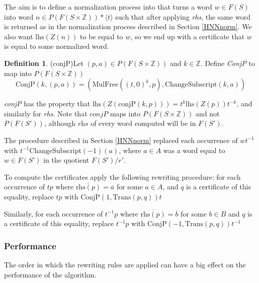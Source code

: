 \documentclass[12pt]{article} %
\theoremstyle{definition}
\theoremstyle{definition}
\theoremstyle{definition}
\theoremstyle{definition}
\theoremstyle{definition}
\newtheorem{defn}[theorem]{Definition}
\theoremstyle{definition}
\begin{document}
The aim is to define a normalization process into that turns a word $w \in F(S)$ into
word $n \in P(F(S \times \mathbb{Z})) \ast \langle t \rangle$
such that after applying \textit{rhs}, the same word is returned as in the
normalization process described in Section \ref{HNNnorm}. We also want
$\text{lhs}(Z(n))$ to be equal to $w$, so we end up with a certificate that $w$
is equal to some normalized word.

\begin{defn}(conjP)\label{conjP}
  Let $(p, a) \in P(F(S \times \mathbb{Z}))$ and $k \in \mathbb{Z}$.
  Define \textit{ConjP} to map into $P(F(S \times \mathbb{Z}))$
  \begin{equation}
    \text{ConjP}(k, (p, a)) = (\text{MulFree}((t,0)^k, p), \text{ChangeSubscript}(k, a))
  \end{equation}
\end{defn}

\textit{conjP} has the property that
$\text{lhs}(Z(\text{conjP}(k, p))) = t^k \text{lhs}(Z(p))t^{-k}$,
and similarly for \textit{rhs}. Note that $\textit{conjP}$ maps into $P(F(S \times \mathbb{Z}))$
and not $P(F(S'))$, although $\textit{rhs}$ of every word computed
will be in $F(S')$.

The procedure described in Section \ref{HNNnorm}
replaced each occurrence of $wt^{-1}$ with \newline $t^{-1}\text{ChangeSubscript}(-1)(a)$,
where $a \in A$ was a word equal to $w \in F(S')$ in the quotient $F(S') / r'$.

To compute the certificates apply the following rewriting procedure:
for each occurrence of $tp$ where $\overline{\text{rhs}(p)} = \overline{a}$ for
some $a \in A$, and $q$ is a certificate of this equality,
replace $tp$ with $\text{ConjP}(1, \text{Trans}(p, q))t$

Similarly, for each occurrence of $t^{-1}p$ where $\overline{\text{rhs}(p)} = \overline{b}$ for
some $b \in B$ and $q$ is a certificate of this equality,
replace $t^{-1}p$ with $\text{ConjP}(-1, \text{Trans}(p, q))t^{-1}$

\subsubsection{Performance}\label{HNNperf}

The order in which the rewriting rules are applied can have a big effect on the performance
of the algorithm.
\end{document}
